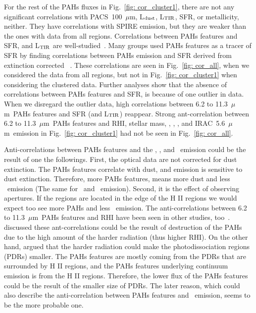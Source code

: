         For the rest of the PAHs fluxes in Fig.~\ref{fig: cor_cluster1}, there are not any significant correlations with PACS~100~$\mu$m, L$_{\rm dust}$, L$_{\rm TIR}$, SFR, or metallicity, neither.
        They have correlations with SPIRE emission, but they are weaker than the ones with data from all regions.
        Correlations between PAHs features and SFR, and L$_{\rm TIR}$ are well-studied~\citep[e.g.][]{Tielens08,Peeters04}. 
        Many groups used PAHs features as a tracer of SFR by finding correlations between 
        PAHs emission and SFR derived from extinction corrected \halpha~\citep[e.g.][]{Shipley16,Khramtsova13,Calzetti07}.
        These correlations are seen in Fig.~\ref{fig: cor_all}, when we considered the data from all regions, but not in Fig.~\ref{fig: cor_cluster1} when considering the clustered data.
        Further analyses show that the absence of correlations between PAHs features and SFR, is because of one outlier in data. 
        When we disregard the outlier data, high correlations between 6.2 to 11.3~$\mu$m~PAHs features and SFR (and L$_{\rm TIR}$) reappear.
        Strong ant-correlation between 6.2 to 11.3~$\mu$m~PAHs features and RHI, stellar mass, \halpha, \sii, \oiii, and IRAC~5.6~$\mu$m~emission in Fig.~\ref{fig: cor_cluster1} had not be seen in Fig.~\ref{fig: cor_all}.
     
        Anti-correlations between PAHs features and the \halpha, \sii, and \oiii~emission could be the result of one the followings. 
        First, the optical data are not corrected for dust extinction.
        The PAHs features correlate with dust, and \halpha emission is sensitive to dust extinction.
        Therefore, more PAHs features, means more dust and less \halpha~emission (The same for \sii~and \oiii~emission).
        Second, it is the effect of observing apertures.
        If the regions are located in the edge of the H {\sc II} regions we would expect too see more PAHs and less \halpha~emission. %
        The anti-correlations between 6.2 to 11.3~$\mu$m~PAHs features and RHI have been seen in other studies, too~\citep[e.g.][]{Dim15, Gordon08, Wu06}.
        \cite{Wu06} discussed these ant-correlations could be the result of destruction of the PAHs due to the high amount of the harder radiation (thus higher RHI).
        On the other hand, \cite{Gordon08} argued that the harder radiation could make the photodissociation regions (PDRs) smaller.
        The PAHs features are mostly coming from the PDRs that are surrounded by H {\sc II} regions, and the PAHs features underlying continuum emission is from the H {\sc II} regions.
        Therefore, the lower flux of the PAHs features could be the result of the smaller size of PDRs.
        The later reason, which could also describe the anti-correlation between PAHs features and \halpha~emission, seems to be the more probable one. 
        
